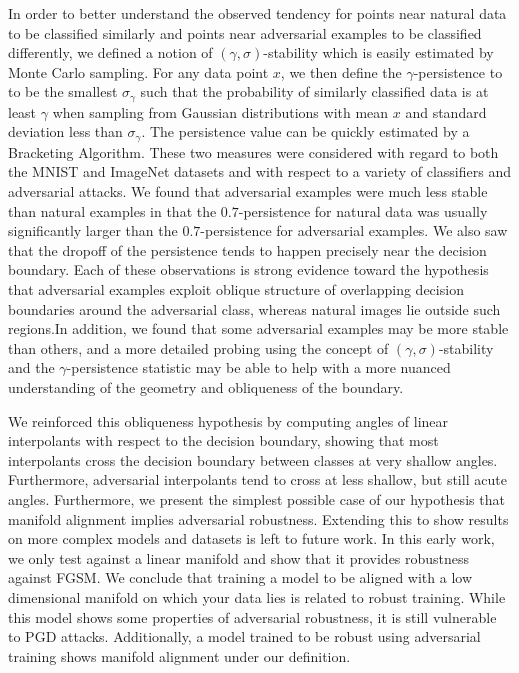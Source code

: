 



In order to better understand the observed tendency for points near natural data to be classified similarly and points near
adversarial examples to be classified differently, we defined a notion of $(\gamma,\sigma)$-stability which is easily estimated by Monte Carlo sampling. For any data point $x$, we then define the $\gamma$-persistence to to be the smallest $\sigma_\gamma$ such that the probability of similarly classified data is at least $\gamma$ when sampling from Gaussian distributions with mean $x$ and standard deviation less than $\sigma_\gamma$. The persistence value can be quickly estimated by a Bracketing Algorithm. These two measures were considered with regard to both the MNIST and ImageNet datasets and with respect to a variety of classifiers and adversarial attacks. We found that adversarial examples were much less stable than natural examples in that the $0.7$-persistence for natural data was usually significantly larger than the $0.7$-persistence for adversarial examples. We also saw that the dropoff of the persistence tends to happen precisely near the decision boundary. Each of these observations is strong evidence toward the hypothesis that adversarial examples exploit oblique structure of overlapping decision boundaries around the adversarial class, whereas natural images lie outside such regions.In addition, we found that some adversarial examples may be more stable than others, and a more detailed probing using the concept of $(\gamma,\sigma)$-stability and the $\gamma$-persistence statistic may be able to help with a more nuanced understanding of the geometry and obliqueness of the boundary.

We reinforced this obliqueness hypothesis by computing angles of linear interpolants with respect to the decision boundary, showing that most interpolants cross the decision boundary between classes at very shallow angles. Furthermore, adversarial interpolants tend to cross at less shallow, but still acute angles. Furthermore, we present the simplest possible case of our hypothesis that manifold alignment implies adversarial robustness.
Extending this to show results on more complex models and datasets is left to future work.
In this early work, we only test against a linear manifold and show that it provides robustness against FGSM.
We conclude that training a model to be aligned with a low dimensional manifold on which your data lies is related to robust training.
While this model shows some properties of adversarial robustness, it is still vulnerable to PGD attacks.
Additionally, a model trained to be robust using adversarial training shows manifold alignment under our definition.

